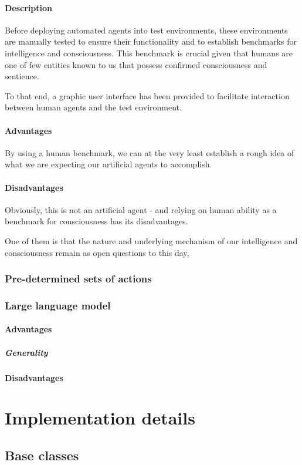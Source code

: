 \documentclass[masterthesis]{fer}
\begin{document}
\paragraph{Description}
Before deploying automated agents into test environments, 
these environments are manually tested to ensure their functionality and to establish benchmarks for intelligence and consciousness. This benchmark is crucial given that humans are one of few entities known to us that possess confirmed consciousness and sentience.

To that end, a graphic user interface has been provided to facilitate interaction between human agents and the test environment.
\paragraph{Advantages}
By using a human benchmark, we can at the very least establish a rough idea of what we are expecting our artificial agents to accomplish. 
\paragraph{Disadvantages}
Obviously, this is not an artificial agent - and relying on human ability as a benchmark for consciousness has its disadvantages.

One of them is that the nature and underlying mechanism of our intelligence and consciousness remain as open questions to this day,
\subsubsection{Pre-determined sets of actions}

\subsubsection{Large language model}
\paragraph{Advantages}
\subparagraph{Generality}
\paragraph{Disadvantages}

\section{Implementation details}
\subsection{Base classes}
\end{document}
